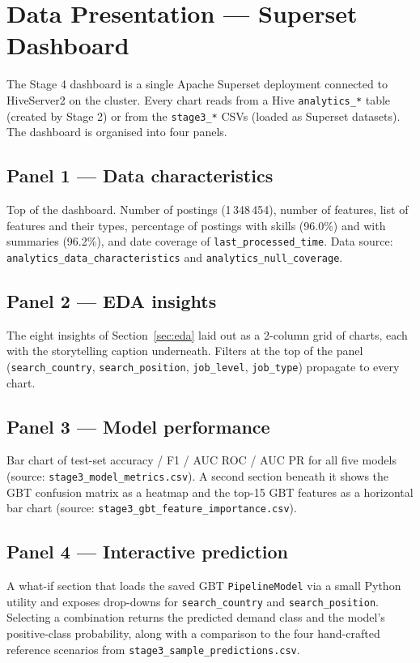 \documentclass[11pt,a4paper]{article}
\begin{document}
\section{Data Presentation --- Superset Dashboard}
\label{sec:dashboard}

The Stage 4 dashboard is a single Apache Superset deployment connected
to HiveServer2 on the cluster.  Every chart reads from a Hive
\texttt{analytics\_*} table (created by Stage 2) or from the
\texttt{stage3\_*} CSVs (loaded as Superset datasets).  The dashboard
is organised into four panels.

\subsection{Panel 1 --- Data characteristics}
Top of the dashboard.  Number of postings (1\,348\,454), number of
features, list of features and their types, percentage of postings
with skills (96.0\%) and with summaries (96.2\%), and date coverage of
\texttt{last\_processed\_time}.  Data source:
\texttt{analytics\_data\_characteristics} and
\texttt{analytics\_null\_coverage}.

\subsection{Panel 2 --- EDA insights}
The eight insights of Section~\ref{sec:eda} laid out as a 2-column
grid of charts, each with the storytelling caption underneath.
Filters at the top of the panel (\texttt{search\_country},
\texttt{search\_position}, \texttt{job\_level}, \texttt{job\_type})
propagate to every chart.

\subsection{Panel 3 --- Model performance}
Bar chart of test-set accuracy / F1 / AUC ROC / AUC PR for all five
models (source: \texttt{stage3\_model\_metrics.csv}).  A second
section beneath it shows the GBT confusion matrix as a heatmap and
the top-15 GBT features as a horizontal bar chart (source:
\texttt{stage3\_gbt\_feature\_importance.csv}).

\subsection{Panel 4 --- Interactive prediction}
A what-if section that loads the saved GBT \texttt{PipelineModel} via
a small Python utility and exposes drop-downs for
\texttt{search\_country} and \texttt{search\_position}.  Selecting a
combination returns the predicted demand class and the model's
positive-class probability, along with a comparison to the four
hand-crafted reference scenarios from
\texttt{stage3\_sample\_predictions.csv}.
\end{document}
